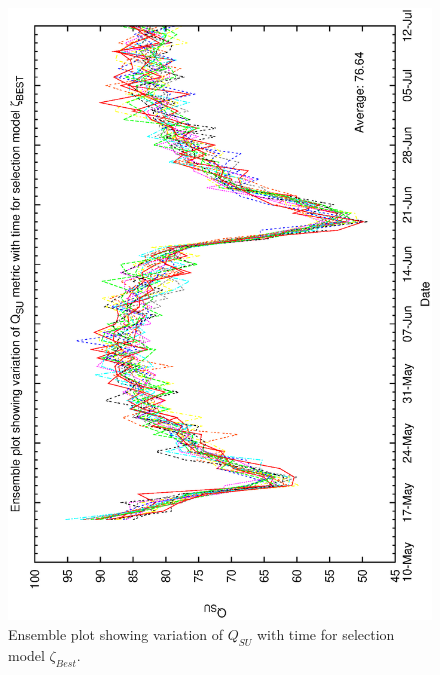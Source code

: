 \begin{figure}[h]
\begin{center}
   \includegraphics[scale=0.5, angle=-90]{figures/best_ensemble.eps}
   \caption[Ensemble plot showing variation of $Q_{SU}$ with time for selection model $\zeta_{Best}$.] 
   {Ensemble plot showing variation of $Q_{SU}$ with time for selection model $\zeta_{Best}$.}
   \label{fig:ensemble_best}
\end{center}
\end{figure}

